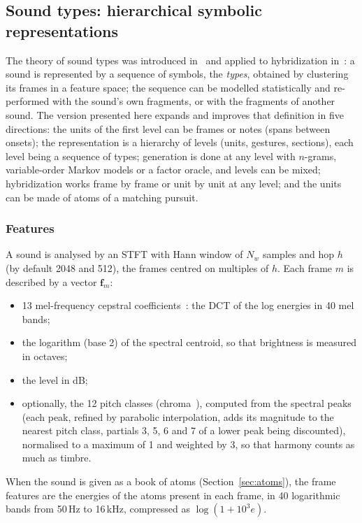 \documentclass[11pt,a4paper]{article}
\begin{document}
\subsection{Sound types: hierarchical symbolic representations}

The theory of sound types was introduced in~\cite{cella2011soundtypes} and
applied to hybridization in~\cite{cella2013hybrid}: a sound is represented by
a sequence of symbols, the \emph{types}, obtained by clustering its frames in
a feature space; the sequence can be modelled statistically and re-performed
with the sound's own fragments, or with the fragments of another sound. The
version presented here expands and improves that definition in five
directions: the units of the first level can be frames or notes (spans
between onsets); the representation is a hierarchy of levels (units,
gestures, sections), each level being a sequence of types; generation is done
at any level with $n$-grams, variable-order Markov models or a factor oracle,
and levels can be mixed; hybridization works frame by frame or unit by unit
at any level; and the units can be made of atoms of a matching pursuit.

\subsubsection{Features}

A sound is analysed by an STFT with Hann window of $N_w$ samples and hop
$h$ (by default 2048 and 512), the frames centred on multiples of $h$. Each
frame $m$ is described by a vector $\bm{f}_m$:
\begin{itemize}[leftmargin=*]
  \item 13 mel-frequency cepstral coefficients~\cite{davis1980}: the DCT of
    the log energies in 40 mel bands;
  \item the logarithm (base 2) of the spectral centroid, so that brightness
    is measured in octaves;
  \item the level in dB;
  \item optionally, the 12 pitch classes (chroma~\cite{fujishima1999}),
    computed from the spectral peaks (each peak, refined by parabolic
    interpolation, adds its magnitude to the nearest pitch class, partials 3,
    5, 6 and 7 of a lower peak being discounted), normalised to a maximum of
    1 and weighted by 3, so that harmony counts as much as timbre.
\end{itemize}
When the sound is given as a book of atoms (Section~\ref{sec:atoms}), the
frame features are the energies of the atoms present in each frame, in 40
logarithmic bands from 50\,Hz to 16\,kHz, compressed as $\log(1 + 10^3 e)$.
\end{document}
